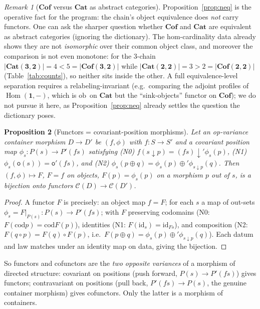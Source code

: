 \documentclass[11pt,a4paper]{article}
\newcommand{\Cat}{\mathbf{Cat}}
\newcommand{\Cof}{\mathbf{Cof}}
\newcommand{\id}{\mathrm{id}}
\newcommand{\cod}{\mathrm{cod}}
\newcommand{\ob}{\mathrm{ob}\,}
\DeclareMathOperator{\Hom}{Hom}
\theoremstyle{definition}\newtheorem{definition}{Definition}[section]
\theoremstyle{plain}\newtheorem{proposition}[definition]{Proposition}
\theoremstyle{remark}\newtheorem{example}[definition]{Example}
\newtheorem{remark}[definition]{Remark}
\begin{document}
\begin{remark}[$\Cof$ versus $\Cat$ as abstract categories]
Proposition~\ref{prop:neq} is the operative fact for the program: the chain's
object equivalence does \emph{not} carry functors. One can ask the sharper
question whether $\Cof$ and $\Cat$ are equivalent as abstract categories
(ignoring the dictionary). The hom-cardinality data already shows they are not
\emph{isomorphic} over their common object class, and moreover the comparison
is not even monotone: for the $3$-chain
$|\Cat(\mathbf3,\mathbf2)|=4<5=|\Cof(\mathbf3,\mathbf2)|$ while
$|\Cat(\mathbf2,\mathbf2)|=3>2=|\Cof(\mathbf2,\mathbf2)|$
(Table~\ref{tab:counts}), so neither sits inside the other. A full
equivalence-level separation requires a relabeling-invariant (e.g.\ comparing
the adjoint profiles of $\Hom(\mathbf1,-)$, which is $\ob$ on $\Cat$ but the
``sink-objects'' functor on $\Cof$); we do not pursue it here, as
Proposition~\ref{prop:neq} already settles the question the dictionary poses.
\end{remark}

\begin{proposition}[Functors = covariant-position morphisms]\label{prop:cov}
Let an \emph{op-variance container morphism} $D\to D'$ be $(f,\phi)$ with
$f\colon S\to S'$ and a \emph{covariant} position map
$\phi_s\colon P(s)\to P'(fs)$ satisfying
\textup{(N0)} $f(s\downarrow p)=(fs)\downarrow'\phi_s(p)$,
\textup{(N1)} $\phi_s(\mathsf o(s))=\mathsf o'(fs)$, and
\textup{(N2)} $\phi_s(p\oplus q)=\phi_s(p)\oplus'\phi_{s\downarrow p}(q)$.
Then $(f,\phi)\mapsto F$, $F=f$ on objects, $F(p)=\phi_s(p)$ on a morphism
$p$ out of $s$, is a bijection onto functors $\mathcal C(D)\to\mathcal C(D')$.
\end{proposition}

\begin{proof}
A functor $F$ is precisely: an object map $f=F$; for each $s$ a map of
out-sets $\phi_s=F|_{P(s)}\colon P(s)\to P'(fs)$; with $F$ preserving codomains
(N0: $F(\cod p)=\cod F(p)$), identities (N1: $F(\id_s)=\id_{Fs}$), and
composition (N2: $F(q\circ p)=F(q)\circ F(p)$, i.e.\
$F(p\oplus q)=\phi_s(p)\oplus'\phi_{s\downarrow p}(q)$). Each datum and law
matches under an identity map on data, giving the bijection.
\end{proof}

So functors and cofunctors are the \emph{two opposite variances} of a
morphism of directed structure: covariant on positions (push forward,
$P(s)\to P'(fs)$) gives functors; contravariant on positions (pull back,
$P'(fs)\to P(s)$, the genuine container morphism) gives cofunctors. Only the
latter is a morphism of containers.
\end{document}
